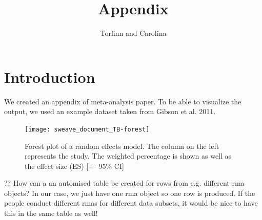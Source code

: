 \documentclass[11pt, a4paper]{article} %
\begin{document}



\title{Appendix}

\author{Torfinn and Carolina}

\maketitle



\section{Introduction}%

We created an appendix of meta-analysis paper. To be able to visualize the output, we used an example dataset taken from Gibson et al. 2011.






\begin{figure}
\captionsetup{width=0.6\textwidth}
\centering
\texttt{[image: sweave\_document\_TB-forest]}
\caption{Forest plot of a random effects model. The column on the left represents the study. The weighted percentage is shown as well as the effect size (ES) [+- 95\% CI]}
\label{fig:forestplot}
\end{figure}



?? How can a an automised table be created for rows from e.g. different rma objects? In our case, we just have one rma object so one row is produced. If the people conduct different rmas for different data subsets, it would be nice to have this in the same table as well!\\
\bigskip
\end{document}
